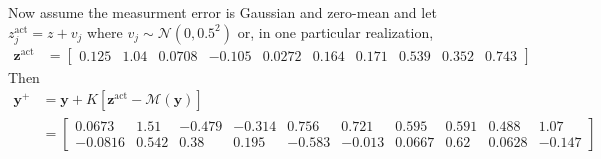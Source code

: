 \documentclass[letterpaper]{tufte-handout}
\newcommand{\y}{\mathbf{y}}
\newcommand{\z}{\mathbf{z}}
\begin{document}
Now assume the measurment error is Gaussian and zero-mean and let $z_j^\text{act} = z + v_j$ where $v_j \sim \mathcal{N}(0,0.5^2)$ or, in one particular realization,
\begin{align*}
\z^\text{act} &= \begin{bmatrix} 0.125 & 1.04 & 0.0708 & -0.105 & 0.0272 & 0.164 & 0.171 & 0.539 & 0.352 & 0.743 \end{bmatrix}
\end{align*}
Then
\begin{align*}
\y^+ &= \y + K\left[\z^{\text{act}} - \mathcal{M}(\y)\right] \\
&=
\begin{bmatrix}
 0.0673 & 1.51 & -0.479 & -0.314 & 0.756 & 0.721 & 0.595 & 0.591 & 0.488 & 1.07\\ -0.0816 & 0.542 & 0.38 & 0.195 & -0.583 & -0.013 & 0.0667 & 0.62 & 0.0628 & -0.147 
\end{bmatrix}
\end{align*}
\end{document}

